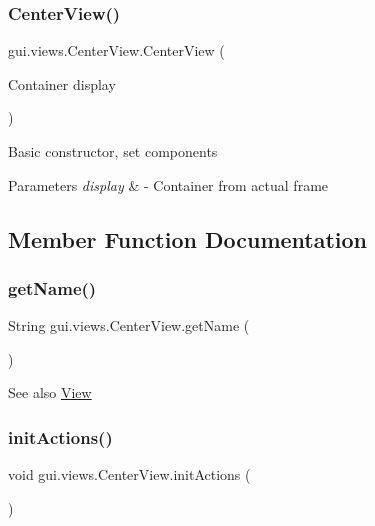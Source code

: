 \subsubsection{\texorpdfstring{Center\+View()}{CenterView()}}
{\footnotesize\ttfamily gui.\+views.\+Center\+View.\+Center\+View (\begin{DoxyParamCaption}\item[{Container}]{display }\end{DoxyParamCaption})\hspace{0.3cm}{\ttfamily [inline]}}

Basic constructor, set components


\begin{DoxyParams}{Parameters}
{\em display} & -\/ Container from actual frame \\
\hline
\end{DoxyParams}


\subsection{Member Function Documentation}
\mbox{\label{classgui_1_1views_1_1_center_view_a9137970d5f143813a78b78d63316f9c3}} 
\subsubsection{\texorpdfstring{get\+Name()}{getName()}}
{\footnotesize\ttfamily String gui.\+views.\+Center\+View.\+get\+Name (\begin{DoxyParamCaption}{ }\end{DoxyParamCaption})\hspace{0.3cm}{\ttfamily [inline]}}

\begin{DoxySeeAlso}{See also}
\mbox{\hyperlink{classgui_1_1views_1_1_view}{View}} 
\end{DoxySeeAlso}
\mbox{\label{classgui_1_1views_1_1_center_view_acfa598e297fc3ef6a2649d4a188f5da4}} 
\subsubsection{\texorpdfstring{init\+Actions()}{initActions()}}
{\footnotesize\ttfamily void gui.\+views.\+Center\+View.\+init\+Actions (\begin{DoxyParamCaption}{ }\end{DoxyParamCaption})\hspace{0.3cm}{\ttfamily [inline]}}

